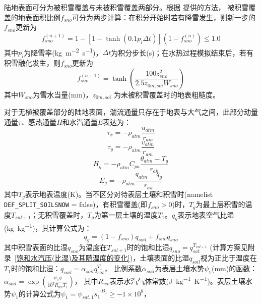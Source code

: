 陆地表面可分为被积雪覆盖与未被积雪覆盖两部分。根据 \citet{swenson2012new}提供的方法，
被积雪覆盖的地表面积比例$f_{sno}$可分为两步计算：在积分开始时若有降雪发生，则新一步的$f_{sno}$更新为
\begin{equation}
f_{{sno }}^{(n+1)}=1-\left[1-\tanh\left(0.1 p_{i} \Delta t\right)\right]\left(1-f_{{sno }}^{(n)}\right) \leq 1.0
\end{equation}
其中$p_i$为降雪率(\unit{kg.m^{-2}.s^{-1}})，$\Delta t$为积分步长(s)；在水热过程模拟结束后，若有积雪融化发生，则$f_{sno}$更新为
\begin{equation}
f_{sno}^{(n+1)}=\tanh{\left(\frac{100 z_{s n o}^{2}}{2.5 z_{0 m, s o i} W_{sno}}\right)}
\end{equation}
其中$W_{sno}$为雪水当量(mm)，$z_{0m,soi}$ 为未被积雪覆盖时的地表粗糙度。

对于无植被覆盖部分的陆地表面，湍流通量只存在于地表与大气之间，此部分动量通量$\tau$、感热通量$H$和水汽通量$E$表达为：
\begin{equation}\label{tau_x}
\tau_{x}=-\rho_{atm} \frac{u_{atm}}{r_{a m}}
\end{equation}
\begin{equation}\label{tau_y}
\tau_{y}=-\rho_{atm} \frac{v_{atm}}{r_{a m}}
\end{equation}
\begin{equation}\label{Hg}
H_{g}=-\rho_{atm} C_{pa} \frac{\theta_{atm}-T_{g}}{r_{a h}}
\end{equation}
\begin{equation}\label{Eg}
E_{g}=-\rho_{atm} \frac{q_{atm}-q_{g}}{r_{a w}}
\end{equation}
其中$T_g$表示地表温度(K)。当不区分对待表层土壤和积雪时(namelist \allowbreak \texttt{DEF\_SPLIT\_SOILSNOW} \allowbreak = \allowbreak false)，有积雪覆盖(即$f_{sno}>0$)时，$T_g$为最上层积雪的温度$T_{snl+1}$；无积雪覆盖时，$T_g$为第一层土壤的温度$T_1$。$q_g$表示地表空气比湿(\unit{kg.kg^{-1}})，其计算公式为：
\begin{equation}\label{qg}
q_{g}=\left(1-f_{{sno }}\right) q_{{soil }}+f_{{sno }} q_{{sno }}
\end{equation}
其中积雪表面的比湿$q_{sno}$为温度在$T_{snl+1}$时的饱和比湿$q_{sno}=q_{sat}^{T_{snl+1}}$
(计算方案见附录~\ref{饱和水汽压(比湿)及其随温度的变化})，土壤表面的比湿$q_{soil}$视为正比于温度在$T_1$时的饱和比湿：$q_{soil}=\alpha_{soil}q_{sat}^{T_1}$，
比例系数$\alpha_{soil}$为表层土壤水势$\psi_1$(mm)的函数\citep{philip1957theory}：$\alpha_{soil}=\exp \left(\frac{\psi_1g}{{10}^3R_{wv}T_1}\right)$，
其中$R_{wv}$表示水汽气体常数(\unit{J.kg^{-1}.K^{-1}})。表层土壤水势$\psi_1$的计算公式为$\psi_1=\psi_{sat,1}s_1^{-B_1}\geq-1\times{10}^8$，

